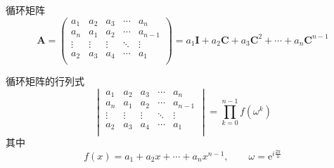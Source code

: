 \documentclass[lang = cn, scheme = chinese, thmcnt = section]{elegantbook}
\newcommand{\bs}{\boldsymbol}          %
\newcommand{\ee}[1]{\mathrm{e}^{#1}}
\begin{document}
\begin{definition}{循环矩阵}
	$$
	\bs{A}=
	\begin{pmatrix}
		a_1 & a_2 & a_3 & \cdots & a_n\\
		a_n & a_1 & a_2 & \cdots & a_{n-1}\\
		\vdots & \vdots & \vdots & \ddots& \vdots\\
		a_2 & a_3 & a_4 & \cdots & a_1\\
	\end{pmatrix}
	=a_1\bs{I}+a_2\bs{C}+a_3\bs{C}^2+\cdots+a_n\bs{C}^{n-1}
	$$
\end{definition}

\begin{proposition}{循环矩阵的行列式}
	$$
	\begin{vmatrix}
		a_1 & a_2 & a_3 & \cdots & a_n\\
		a_n & a_1 & a_2 & \cdots & a_{n-1}\\
		\vdots & \vdots & \vdots & \ddots& \vdots\\
		a_2 & a_3 & a_4 & \cdots & a_1\\
	\end{vmatrix}
	=\prod_{k=0}^{n-1}f(\omega^k)
	$$
	其中%
	$$
	f(x)=a_1+a_2x+\cdots+a_nx^{n-1},\qquad \omega=\ee{i\frac{2\pi}{n}}
	$$
\end{proposition}
\end{document}
